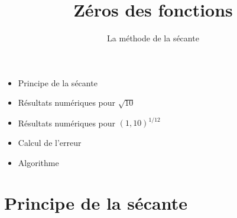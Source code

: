 



\newcommand{\Python}{\texttt{Python}}
\renewcommand{\evidence}[1]{{\color{blue}\textbf{#1}}}

\usepackage{textcomp}

\usepackage{listings}



\newcommand{\codeinline}[1]{\lstinline!#1!}







\title{{\bf Zéros des fonctions}}
\subtitle{La méthode de la sécante}

\begin{frame}
  
  \debutmontitre

  \pause

{\footnotesize
\hfill
{}
\begin{minipage}{0.6\textwidth}
  \begin{itemize}
    \item<3-> Principe de la sécante
    \item<4-> Résultats numériques pour $\sqrt{10}$
    \item<5-> Résultats numériques pour $(1,10)^{1/12}$
    \item<6-> Calcul de l'erreur
    \item<7-> Algorithme    
  \end{itemize}
\end{minipage}
}

\end{frame}

\setcounter{framenumber}{0}


\section{Principe de la sécante}

